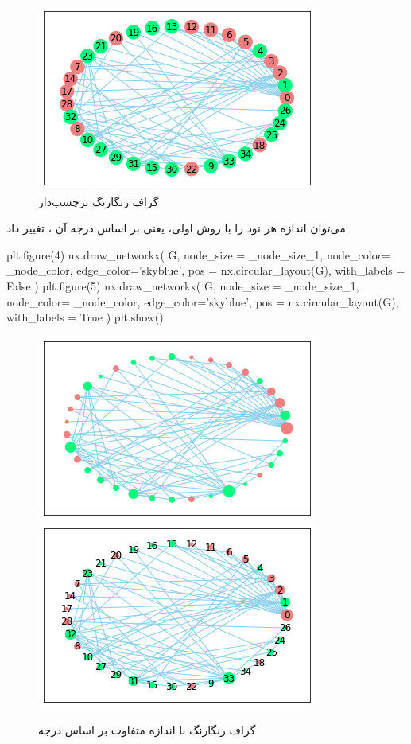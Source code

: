 \documentclass[a4paper, 12pt]{article}
\begin{document}
\begin{figure}[H]
	\begin{center}
		\includegraphics[scale=0.8]{fig3.png}
	\end{center}
\caption{گراف رنگارنگ برچسب‌دار}
\end{figure}
می‌توان اندازه هر نود را با روش اولی، یعنی بر اساس درجه آن ، تغییر داد:
\begin{latin}
	\begin{python}
plt.figure(4)
nx.draw_networkx(
	G,
	node_size = _node_size_1,
	node_color= _node_color,
	edge_color='skyblue',
	pos = nx.circular_layout(G),
	with_labels = False
)
plt.figure(5)
nx.draw_networkx(
	G,
	node_size = _node_size_1,
	node_color= _node_color,
	edge_color='skyblue',
	pos = nx.circular_layout(G),
	with_labels = True
)
plt.show()
	\end{python}
\end{latin}
\begin{figure}[H]
	\begin{center}
		\includegraphics[scale=0.6]{fig4.png}
		\includegraphics[scale=0.6]{fig5.png}
	\end{center}
	\caption{گراف رنگارنگ با اندازه متفاوت بر اساس درجه}
\end{figure}
\end{document}
